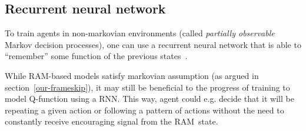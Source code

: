 \subsection{Recurrent neural network}
To train agents in non-markovian environments (called \emph{partially observable} Markov decision processes), one can use a recurrent neural network that is able to ``remember'' some function of the previous states~\cite{minecraft-pomdp}.

While RAM-based models satisfy markovian assumption (as argued in section~\ref{our-frameskip}), it may still be beneficial to the progress of training to model Q-function using a RNN. This way, agent could e.g. decide that it will be repeating a given action or following a pattern of actions without the need to constantly receive encouraging signal from the RAM~state.

